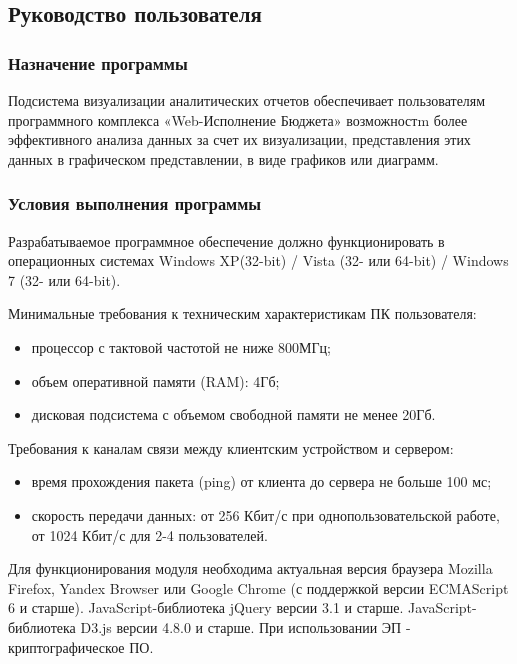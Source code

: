 \documentclass[a4paper]{extarticle}
\begin{document}
\subsection{Руководство пользователя}

\subsubsection{Назначение программы}
Подсистема визуализации аналитических отчетов обеспечивает пользователям программного комплекса «Web-Исполнение Бюджета» возможностm более эффективного анализа данных за счет их визуализации, представления этих данных в графическом представлении, в виде графиков или диаграмм.

\subsubsection{Условия выполнения программы}
Разрабатываемое программное обеспечение должно функционировать в операционных системах Windows XP(32-bit) / Vista (32- или 64-bit) / Windows 7 (32- или 64-bit).\par
Минимальные требования к техническим характеристикам ПК пользователя:\par
\begin{itemize}
  \item процессор с тактовой частотой не ниже 800МГц;
  \item объем оперативной памяти (RAM): 4Гб;
  \item дисковая подсистема с объемом свободной памяти не менее 20Гб.
\end{itemize}\par
Требования к каналам связи между клиентским устройством и сервером:\par
\begin{itemize}
  \item время прохождения пакета (ping) от клиента до сервера не больше 100 мс;
  \item скорость передачи данных: от 256 Кбит/с при однопользовательской работе, от 1024 Кбит/с для 2-4 пользователей.
\end{itemize}\par
Для функционирования модуля необходима актуальная версия браузера Mozilla Firefox, Yandex Browser или Google Chrome (с поддержкой версии ECMAScript 6 и старше). JavaScript-библиотека jQuery версии 3.1 и старше. JavaScript-библиотека D3.js версии 4.8.0 и старше. При использовании ЭП - криптографическое ПО.
\end{document}
